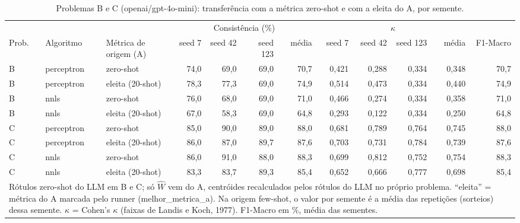 \begin{table}[htbp]
\centering
\footnotesize
\caption{Problemas B e C (openai/gpt-4o-mini): transferência com a métrica zero-shot e com a eleita do A, por semente.}
\label{tab:T8_transf_gpt4mini}
\begin{tabular}{lllrrrrrrrrr}
\toprule
 &  &  & \multicolumn{4}{c}{Consistência (\%)} & \multicolumn{4}{c}{$\kappa$} &  \\ \cmidrule(lr){4-7} \cmidrule(lr){8-11}
Prob. & Algoritmo & Métrica de origem (A) & seed 7 & seed 42 & seed 123 & média & seed 7 & seed 42 & seed 123 & média & F1-Macro \\
\midrule
B & perceptron & zero-shot & 74,0 & 69,0 & 69,0 & 70,7 & 0,421 & 0,288 & 0,334 & 0,348 & 70,7 \\
B & perceptron & eleita (20-shot) & 78,3 & 77,3 & 69,0 & 74,9 & 0,514 & 0,473 & 0,334 & 0,440 & 74,9 \\
B & nnls & zero-shot & 76,0 & 68,0 & 69,0 & 71,0 & 0,466 & 0,274 & 0,334 & 0,358 & 71,0 \\
B & nnls & eleita (20-shot) & 67,0 & 58,3 & 69,0 & 64,8 & 0,293 & 0,122 & 0,334 & 0,250 & 64,8 \\
\midrule
C & perceptron & zero-shot & 85,0 & 90,0 & 89,0 & 88,0 & 0,681 & 0,789 & 0,764 & 0,745 & 88,0 \\
C & perceptron & eleita (20-shot) & 86,0 & 87,0 & 89,7 & 87,6 & 0,703 & 0,731 & 0,784 & 0,739 & 87,6 \\
C & nnls & zero-shot & 86,0 & 91,0 & 88,0 & 88,3 & 0,699 & 0,812 & 0,752 & 0,754 & 88,3 \\
C & nnls & eleita (20-shot) & 83,3 & 83,7 & 89,3 & 85,4 & 0,652 & 0,666 & 0,777 & 0,698 & 85,4 \\
\bottomrule
\multicolumn{12}{p{0.95\linewidth}}{\footnotesize Rótulos zero-shot do LLM em B e C; só $\hat{W}$ vem do A, centróides recalculados pelos rótulos do LLM no próprio problema. ``eleita'' = métrica do A marcada pelo runner (melhor\_metrica\_a). Na origem few-shot, o valor por semente é a média das repetições (sorteios) dessa semente. $\kappa$ = Cohen's $\kappa$ (faixas de Landis e Koch, 1977). F1-Macro em \%, média das sementes.} \\
\end{tabular}
\end{table}
